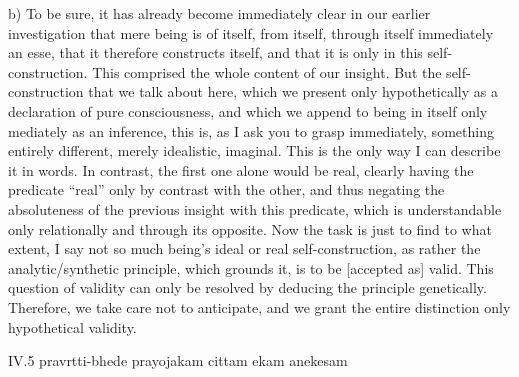 b) To be sure, it has already become immediately clear
in our earlier investigation that mere being is
of itself, from itself, through itself immediately an esse,
that it therefore constructs itself,
and that it is only in this self-construction.
This comprised the whole content of our insight.
But the self-construction that we talk about here,
which we present only hypothetically as
a declaration of pure consciousness,
and which we append to being in itself
only mediately as an inference,
this is, as I ask you to grasp immediately,
something entirely different, merely idealistic, imaginal.
This is the only way I can describe it in words.
In contrast, the first one alone would be real,
clearly having the predicate “real”
only by contrast with the other,
and thus negating the absoluteness of
the previous insight with this predicate,
which is understandable only relationally
and through its opposite.
Now the task is just to find to what extent,
I say not so much being's ideal or real self-construction,
as rather the analytic/synthetic principle,
which grounds it, is to be [accepted as] valid.
This question of validity can only be resolved
by deducing the principle genetically.
Therefore, we take care not to anticipate,
and we grant the entire distinction
only hypothetical validity.

IV.5
pravrtti-bhede prayojakam cittam ekam anekesam

